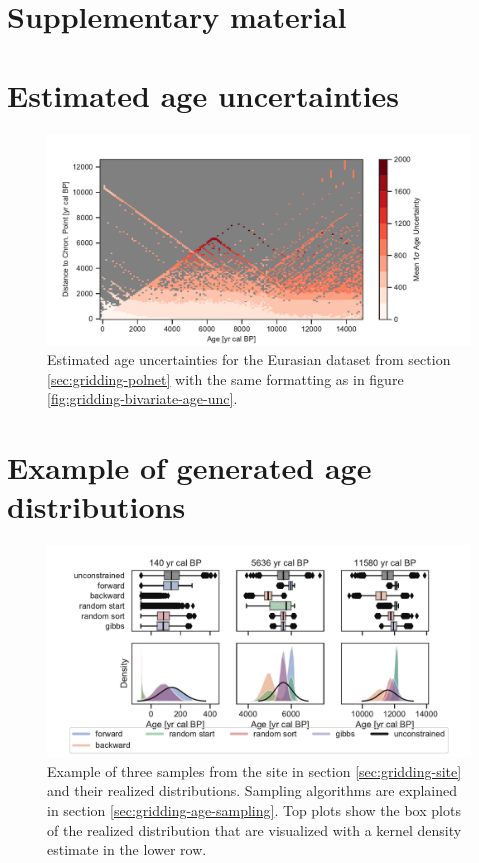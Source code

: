 \begin{refsection}
\clearpage

\begin{subappendices}
	\section*{Supplementary material}
	
	\section{Estimated age uncertainties}  \label{sec:gridding-suppl-age-uncertainties}	
		\begin{figure}[!h]
			\includegraphics[width=\linewidth]{gridding-figures/realized-age-uncertainties.pdf}
			\caption[Estimated age uncertainties]{Estimated age uncertainties for the Eurasian dataset from section \ref{sec:gridding-polnet} with the same formatting as in figure \ref{fig:gridding-bivariate-age-unc}.}
			\label{fig:gridding-age-uncertainties}
		\end{figure}

	\section{Example of generated age distributions} \label{sec:gridding-suppl-age-example-distributions}
		\begin{figure}[!h]
			\includegraphics[width=\linewidth]{gridding-figures/age-sampling-methods-use-case.pdf}
			\caption[Example of sampled distribution]{Example of three samples from the site in section \ref{sec:gridding-site} and their realized distributions. Sampling algorithms are explained in section \ref{sec:gridding-age-sampling}. Top plots show the box plots of the realized distribution that are visualized with a kernel density estimate in the lower row.}
			\label{fig:gridding-age-example-distributions}
		\end{figure}
	

\end{subappendices}
\end{refsection}
